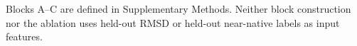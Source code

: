 \begin{table}[!ht]
\vspace{2pt}
\raggedright\footnotesize
Blocks A--C are defined in Supplementary Methods. Neither block construction nor the ablation uses held-out RMSD or held-out near-native labels as input features.
\end{table}
